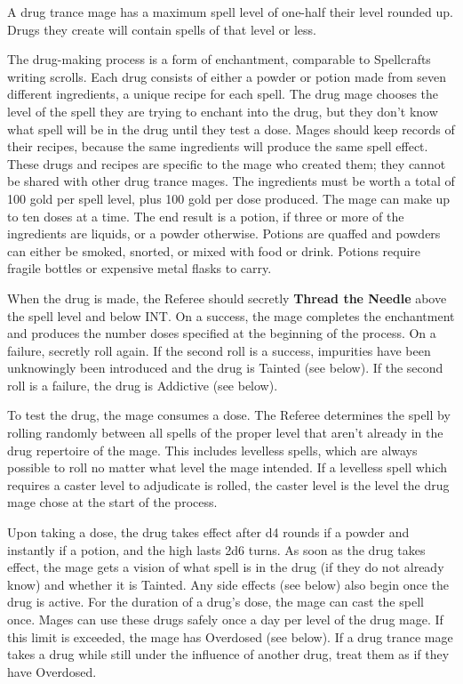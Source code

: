 \documentclass[twoside]{article}
\newcommand{\TTN}[2]{\textbf{Thread the Needle} above #1 and below #2}
\begin{document}
\bigbreak

A drug trance mage has a maximum spell level of one-half their level rounded up. Drugs they create will contain spells of that level or less. 

\bigbreak

The drug-making process is a form of enchantment, comparable to Spellcrafts writing scrolls. Each drug consists of either a powder or potion made from seven different ingredients, a unique recipe for each spell. The drug mage chooses the level of the spell they are trying to enchant into the drug, but they don't know what spell will be in the drug until they test a dose. Mages should keep records of their recipes, because the same ingredients will produce the same spell effect. These drugs and recipes are specific to the mage who created them; they cannot be shared with other drug trance mages. The ingredients must be worth a total of 100 gold per spell level, plus 100 gold per dose produced. The mage can make up to ten doses at a time. The end result is a potion, if three or more of the ingredients are liquids, or a powder otherwise. Potions are quaffed and powders can either be smoked, snorted, or mixed with food or drink. Potions require fragile bottles or expensive metal flasks to carry. 

\bigbreak

When the drug is made, the Referee should secretly \TTN{the spell level}{INT}. On a success, the mage completes the enchantment and produces the number doses specified at the beginning of the process. On a failure, secretly roll again. If the second roll is a success, impurities have been unknowingly been introduced and the drug is Tainted (see below). If the second roll is a failure, the drug is Addictive (see below). 

\bigbreak To test the drug, the mage consumes a dose. The Referee determines the spell by rolling randomly between all spells of the proper level that aren't already in the drug repertoire of the mage. This includes levelless spells, which are always possible to roll no matter what level the mage intended. If a levelless spell which requires a caster level to adjudicate is rolled, the caster level is the level the drug mage chose at the start of the process.

\bigbreak

Upon taking a dose, the drug takes effect after d4 rounds if a powder and instantly if a potion, and the high lasts 2d6 turns. As soon as the drug takes effect, the mage gets a vision of what spell is in the drug (if they do not already know) and whether it is Tainted. Any side effects (see below) also begin once the drug is active. For the duration of a drug's dose, the mage can cast the spell once. Mages can use these drugs safely once a day per level of the drug mage. If this limit is exceeded, the mage has Overdosed (see below). If a drug trance mage takes a drug while still under the influence of another drug, treat them as if they have Overdosed.
\end{document}

